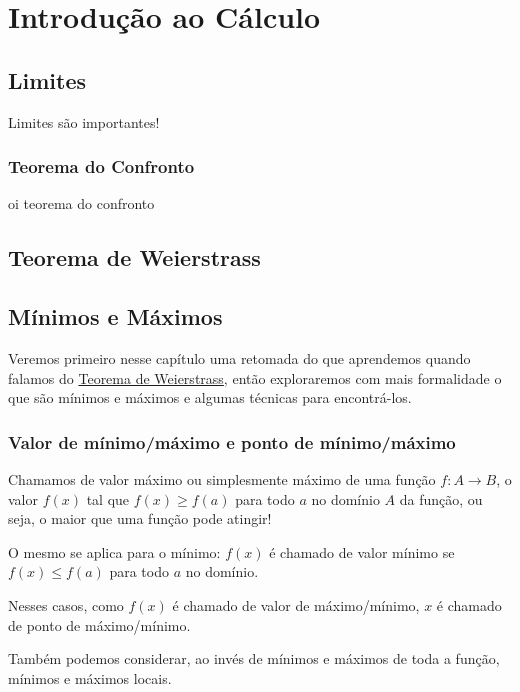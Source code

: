 \documentclass[
  letterpaper,
  DIV=11,
  numbers=noendperiod]{scrreprt}
\begin{document}
\part{Introdução ao Cálculo}

\chapter{Limites}\label{limites}

Limites são importantes!

\section{Teorema do Confronto}\label{sec-confronto}

oi teorema do confronto

\chapter{Teorema de Weierstrass}\label{sec-weierstrass}

\chapter{Mínimos e Máximos}\label{muxednimos-e-muxe1ximos}

Veremos primeiro nesse capítulo uma retomada do que aprendemos quando
falamos do \href{weierstrass.qmd}{Teorema de Weierstrass}, então
exploraremos com mais formalidade o que são mínimos e máximos e algumas
técnicas para encontrá-los.

\section{Valor de mínimo/máximo e ponto de
mínimo/máximo}\label{valor-de-muxednimomuxe1ximo-e-ponto-de-muxednimomuxe1ximo}

Chamamos de valor máximo ou simplesmente máximo de uma função
\(f: A \rightarrow B\), o valor \(f(x)\) tal que \(f(x) \geq f(a)\) para
todo \(a\) no domínio \(A\) da função, ou seja, o maior que uma função
pode atingir!

O mesmo se aplica para o mínimo: \(f(x)\) é chamado de valor mínimo se
\(f(x) \leq f(a)\) para todo \(a\) no domínio.

Nesses casos, como \(f(x)\) é chamado de valor de máximo/mínimo, \(x\) é
chamado de ponto de máximo/mínimo.

Também podemos considerar, ao invés de mínimos e máximos de toda a
função, mínimos e máximos locais.
\end{document}
